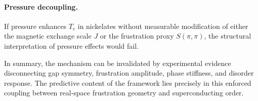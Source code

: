   \paragraph{Pressure decoupling.}
    If pressure enhances $T_c$ in nickelates without measurable modification of
    either the magnetic exchange scale $J$ or the frustration proxy
    $S(\pi,\pi)$, the structural interpretation of pressure effects would fail.

    \bigskip
    In summary, the mechanism can be invalidated by experimental evidence
    disconnecting gap symmetry, frustration amplitude, phase stiffness,
    and disorder response.
    The predictive content of the framework lies precisely in this enforced
    coupling between real-space frustration geometry and superconducting
    order.
